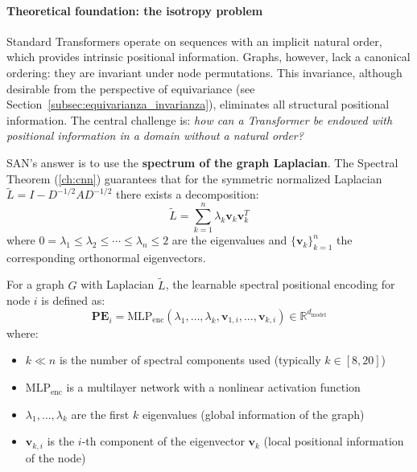 \paragraph{Theoretical foundation: the isotropy problem}

Standard \glspl{Transformer} operate on sequences with an implicit natural order, which provides intrinsic positional information. Graphs, however, lack a canonical ordering: they are invariant under node permutations. This invariance, although desirable from the perspective of equivariance (see Section~\ref{subsec:equivarianza_invarianza}), eliminates all structural positional information. The central challenge is: \textit{how can a \gls{Transformer} be endowed with positional information in a domain without a natural order?}

SAN's answer is to use the \textbf{spectrum of the graph Laplacian}. The Spectral Theorem (\autoref{ch:cnn}) guarantees that for the symmetric normalized Laplacian $\tilde{L} = I - D^{-1/2}AD^{-1/2}$ there exists a decomposition:
\begin{equation}
    \tilde{L} = \sum_{k=1}^{n} \lambda_k \mathbf{v}_k \mathbf{v}_k^T
    \label{eq:spectral_decomposition_san}
\end{equation}
where $0 = \lambda_1 \leq \lambda_2 \leq \cdots \leq \lambda_n \leq 2$ are the eigenvalues and $\{\mathbf{v}_k\}_{k=1}^{n}$ the corresponding orthonormal eigenvectors.

\begin{definition}\label{def:learned_spectral_pe}
For a graph $G$ with Laplacian $\tilde{L}$, the learnable spectral positional encoding for node $i$ is defined as:
\begin{equation}
    \mathbf{PE}_i = \text{MLP}_{\text{enc}}(\lambda_1, \ldots, \lambda_k, \mathbf{v}_{1,i}, \ldots, \mathbf{v}_{k,i}) \in \mathbb{R}^{d_{\text{model}}}
    \label{eq:san_learned_positional_encoding}
\end{equation}
where:
\begin{itemize}
    \item $k \ll n$ is the number of spectral components used (typically $k \in [8, 20]$)
    \item $\text{MLP}_{\text{enc}}$ is a multilayer network with a nonlinear activation function
    \item $\lambda_1, \ldots, \lambda_k$ are the first $k$ eigenvalues (global information of the graph)
    \item $\mathbf{v}_{k,i}$ is the $i$-th component of the eigenvector $\mathbf{v}_k$ (local positional information of the node)
\end{itemize}
\end{definition}


